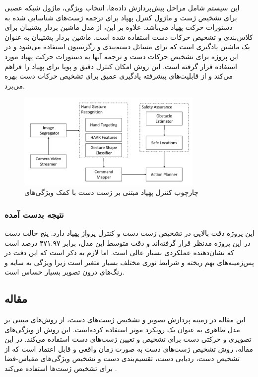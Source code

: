 این سیستم شامل مراحل پیش‌پردازش داده‌ها، انتخاب ویژگی، ماژول شبکه عصبی برای تشخیص ژست و ماژول کنترل پهپاد برای ترجمه 
ژست‌های شناسایی شده به دستورات حرکت پهپاد می‌باشد. علاوه بر این، از مدل ماشین بردار پشتیبان برای کلاس‌بندی و تشخیص حرکات دست استفاده شده است. ماشین بردار پشتیبان به عنوان یک ماشین یادگیری 
است که برای مسائل دسته‌بندی و رگرسیون استفاده می‌شود و در این پروژه برای تشخیص حرکات دست و ترجمه آنها به دستورات حرکت پهپاد مورد استفاده قرار گرفته است. این روش امکان 
کنترل دقیق و پویا برای پهپاد را فراهم می‌کند و از قابلیت‌های پیشرفته یادگیری عمیق برای تشخیص حرکات دست بهره می‌برد.

\begin{figure}[h]
    \centering
    \includegraphics[width=0.8\textwidth]{Haar2.png}
    \caption{چارچوب کنترل پهپاد مبتنی بر ژست دست با کمک ویژگی‌های }
\end{figure}

\subsubsection{نتیجه بدست آمده}
این پروژه دقت بالایی در تشخیص ژست دست و کنترل پرواز پهپاد دارد. پنج حالت دست در این پروژه مدنظر قرار گرفته‌اند و دقت متوسط این مدل، برابر ۴۷۱.۹۷ درصد 
است که نشان‌دهنده عملکردی بسیار عالی است. اما لازم به ذکر است که این دقت در پس‌زمینه‌های بهم ریخته و شرایط نوری مختلف 
بسیار متغیر است زیرا ویژگی  به سایه و رنگ‌های درون تصویر بسیار حساس است.



\subsection{مقاله }
این مقاله در زمینه پردازش تصویر و تشخیص ژست‌های دست، از روش‌های مبتنی بر مدل ظاهری به عنوان یک رویکرد موثر استفاده کرده‌‌است.
این روش‌ از ویژگی‌های تصویری و حرکتی دست برای تشخیص و تعیین ژست‌های دست استفاده می‌کند. در این مقاله، روش تشخیص ژست‌های دست به صورت زمان واقعی و 
قابل اعتماد است که از تشخیص دست، ردیابی دست، تقسیم‌بندی دست و تشخیص ویژگی‌های مقیاس-فضا برای تشخیص ژست‌ها استفاده می‌کند \cite{fang2007real}.

